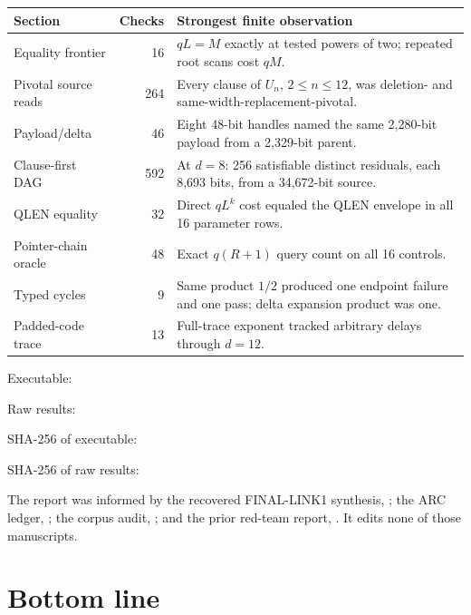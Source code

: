 \documentclass[11pt]{article}
\begin{document}
\begin{center}
\small
\begin{tabular}{@{}L{0.32\textwidth}rL{0.46\textwidth}@{}}
\toprule
Section & Checks & Strongest finite observation\\
\midrule
Equality frontier & 16 & $qL=M$ exactly at tested powers of two; repeated
root scans cost $qM$.\\
Pivotal source reads & 264 & Every clause of $U_n$, $2\le n\le12$, was
deletion- and same-width-replacement-pivotal.\\
Payload/delta & 46 & Eight 48-bit handles named the same 2,280-bit payload
from a 2,329-bit parent.\\
Clause-first DAG & 592 & At $d=8$: 256 satisfiable distinct residuals, each
8,693 bits, from a 34,672-bit source.\\
QLEN equality & 32 & Direct $qL^k$ cost equaled the QLEN envelope in all 16
parameter rows.\\
Pointer-chain oracle & 48 & Exact $q(R+1)$ query count on all 16 controls.\\
Typed cycles & 9 & Same product $1/2$ produced one endpoint failure and one
pass; delta expansion product was one.\\
Padded-code trace & 13 & Full-trace exponent tracked arbitrary delays through
$d=12$.\\
\bottomrule
\end{tabular}
\end{center}

Executable:

Raw results:

SHA-256 of executable:

SHA-256 of raw results:

The report was informed by the recovered FINAL-LINK1 synthesis,
; the ARC ledger,
; the corpus
audit,
; and the
prior red-team report,
.  It edits
none of those manuscripts.

\section{Bottom line}
\end{document}
